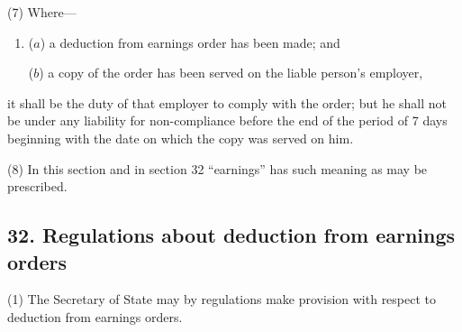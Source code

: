 \documentclass[12pt,a4paper]{article}
\begin{document}
(7) Where—
\begin{enumerate}\item[]
($a$) a deduction from earnings order has been made; and

($b$) a copy of the order has been served on the liable person’s employer,
\end{enumerate}
it shall be the duty of that employer to comply with the order; but he shall not be under any liability for non-compliance before the end of the period of 7 days beginning with the date on which the copy was served on him.

(8) In this section and in section 32 “earnings” has such meaning as may be prescribed.


\subsection{32. Regulations about deduction from earnings orders}

(1) The Secretary of State may by regulations make provision with respect to deduction from earnings orders.
\end{document}
